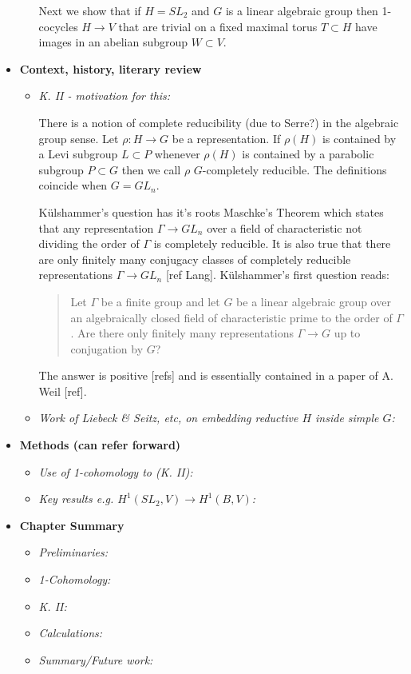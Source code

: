 \begin{itemize}
\begin{itemize}
		Next we show that if $H = SL_2$ and $G$ is a linear algebraic group then 1-cocycles $H\rightarrow V$ that are trivial on a fixed maximal torus $T\subset H$ have images in an abelian subgroup $W\subset V$.
	\end{itemize}

	\item[] \textbf{Context, history, literary review}
	\begin{itemize}
		\item \emph{K. II - motivation for this:}
		
		
		
		There is a notion of complete reducibility (due to Serre?) in the algebraic group sense. Let $\rho:H\rightarrow G$ be a representation. If $\rho(H)$ is contained by a Levi subgroup $L\subset P$ whenever $\rho(H)$ is contained by a parabolic subgroup $P\subset G$ then we call $\rho$ $G$-completely reducible. The definitions coincide when $G=GL_n$.
		
		
		K\"ulshammer's question has it's roots Maschke's Theorem which states that any representation $\Gamma \rightarrow GL_n$ over a field of characteristic not dividing the order of $\Gamma$ is completely reducible.  It is also true that there are only finitely many conjugacy classes of completely reducible representations $\Gamma \rightarrow GL_n$ [ref Lang]. 
		K\"ulshammer's first question reads:
		\begin{quote}
			Let $\Gamma$ be a finite group and let $G$ be a linear algebraic group over an algebraically closed field of characteristic prime to the order of $\Gamma$. Are there only finitely many representations $\Gamma\rightarrow G$ up to conjugation by $G$?
		\end{quote}
		The answer is positive [refs] and is essentially contained in a paper of A. Weil [ref].
		
		
		
		
		
		
		\item \emph{Work of Liebeck \& Seitz, etc, on embedding reductive $H$ inside simple $G$:}
		
	\end{itemize}

	\item[] \textbf{Methods (can refer forward)}
	\begin{itemize}
		\item \emph{Use of 1-cohomology to (K. II):}
		\item \emph{Key results e.g. $H^1(SL_2, V)\rightarrow H^1(B, V)$:}
	\end{itemize}
	
	\item[] \textbf{Chapter Summary}
	\begin{itemize}
		\item \emph{Preliminaries:}
		\item \emph{1-Cohomology:}
		\item \emph{K. II:}
		\item \emph{Calculations:}
		\item \emph{Summary/Future work:}
	\end{itemize}
\end{itemize}

